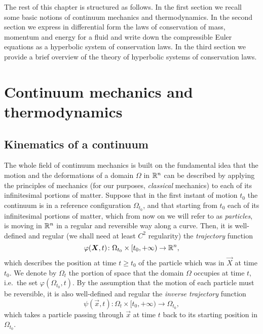 The rest of this chapter is structured as follows.
In the first section we recall some basic notions of continuum
mechanics and thermodynamics. In the second section we express
in differential form the laws of conservation of mass, momentum
and energy for a fluid and write down the compressible Euler equations
as a hyperbolic system of conservation laws.
In the third section we provide a brief overview of the theory of
hyperbolic systems of conservation laws.

\section{Continuum mechanics and thermodynamics}

\subsection*{Kinematics of a continuum}

The whole field of continuum mechanics is built on the fundamental idea that
the motion and the deformations of a domain $\Omega$ in $\mathbb{R}^n$
can be described by applying the principles of mechanics (for our purposes,
\emph{classical} mechanics) to each of its infinitesimal portions of matter.
Suppose that in the first instant of motion $t_0$ the continuum is
in a reference configuration $\Omega_{t_0}$, and that starting from
$t_0$ each of its infinitesimal portions of matter, which from
now on we will refer to as \emph{particles}, is moving in $\mathbb{R}^n$
in a regular and reversible way along a curve. Then, it is well-defined
and regular (we shall need at least $C^2$ regularity)
the \emph{trajectory} function
\[
\varphi(\bm{X},t) \colon \Omega_{t_0} \times [t_0,+\infty) \to \mathbb{R}^n,
\]
which describes the position at time $t \geq t_0$ of the particle which
was in $\vec{X}$ at time $t_0$. We denote by $\Omega_t$ the portion
of space that the domain $\Omega$ occupies at time $t$,
i.e.\ the set $\varphi(\Omega_{t_0},t)$.
By the assumption that the motion of each particle must be reversible,
it is also well-defined and regular the \emph{inverse trajectory} function
\[
\psi(\vec{x},t) \colon \Omega_t \times [t_0,+\infty) \to \Omega_{t_0},
\]
which takes a particle passing through $\vec{x}$ at time $t$ back
to its starting position in $\Omega_{t_0}$.

